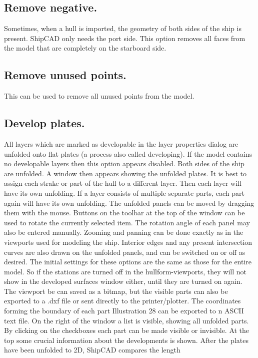 \documentclass[12pt]{article}
\begin{document}
\subsection{Remove negative.}
Sometimes, when a hull is imported, the geometry of both sides of the ship is present. ShipCAD
only needs the port side. This option removes all faces from the model that are completely on the
starboard side.

\subsection{Remove unused points.}
This can be used to remove all unused points from the model.

\subsection{Develop plates.} \label{develop-plates}
All layers which are marked as developable in the layer properties dialog are unfolded onto flat
plates (a process also called developing). If the model contains no developable layers then this
option appears disabled. Both sides of the ship are unfolded. A window then appears showing the
unfolded plates. It is best to assign each strake or part of the hull to a different layer. Then each
layer will have its own unfolding. If a layer consists of multiple separate parts, each part again will
have its own unfolding. The unfolded panels can be moved by dragging them with the mouse.
Buttons on the toolbar at the top of the window can be used to rotate the currently selected item.
The rotation angle of each panel may also be entered manually. Zooming and panning can be done
exactly as in the viewports used for modeling the ship. Interior edges and any present intersection
curves are also drawn on the unfolded panels,
and can be switched on or off as desired. The
initial settings for these options are the same
as those for the entire model. So if the stations
are turned off in the hullform-viewports, they
will not show in the developed surfaces
window either, until they are turned on again.
The viewport be can saved as a bitmap, but
the visible parts can also be exported to a .dxf
file or sent directly to the printer/plotter. The
coordinates forming the boundary of each part
Illustration 28
can be exported to n ASCII text file.
On the right of the window a list is visible, showing all unfolded parts. By clicking on the checkboxes
each part can be made visible or invisible. At the top some crucial information about the
developments is shown. After the plates have been unfolded to 2D, ShipCAD compares the length
\end{document}
